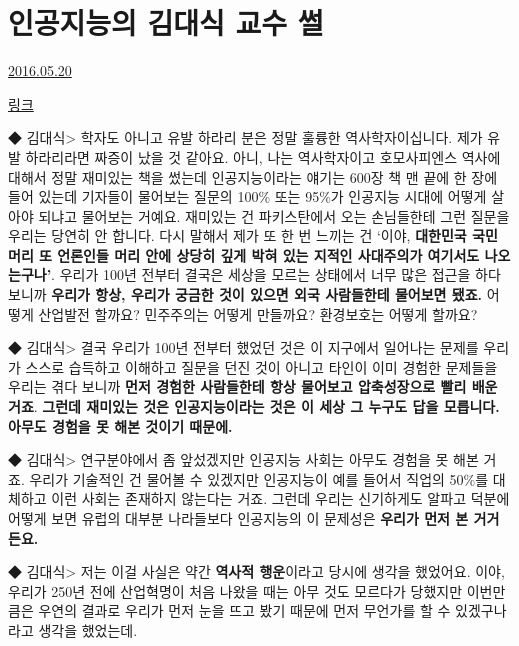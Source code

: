 \section{인공지능의 김대식 교수 썰}
\href{https://www.kockoc.com/Apoc/784899}{2016.05.20}

\vspace{5mm}

\href{http://news.naver.com/main/read.nhn?mode=LSD&mid=sec&sid1=105&oid=079&aid=0002831975}{링크}
\vspace{5mm}

◆ 김대식> 학자도 아니고 유발 하라리 분은 정말 훌륭한 역사학자이십니다. 제가 유발 하라리라면 짜증이 났을 것 같아요. 아니, 나는 역사학자이고 호모사피엔스 역사에 대해서 정말 재미있는 책을 썼는데 인공지능이라는 얘기는 600장 책 맨 끝에 한 장에 들어 있는데 기자들이 물어보는 질문의 100$\%$ 또는 95$\%$가 인공지능 시대에 어떻게 살아야 되냐고 물어보는 거예요. 재미있는 건 파키스탄에서 오는 손님들한테 그런 질문을 우리는 당연히 안 합니다. 다시 말해서 제가 또 한 번 느끼는 건 ‘이야, \textbf{대한민국 국민 머리 또 언론인들 머리 안에 상당히 깊게 박혀 있는 지적인 사대주의가 여기서도 나오는구나’}. 우리가 100년 전부터 결국은 세상을 모르는 상태에서 너무 많은 접근을 하다 보니까 \textbf{우리가 항상, 우리가 궁금한 것이 있으면 외국 사람들한테 물어보면 됐죠.} 어떻게 산업발전 할까요? 민주주의는 어떻게 만들까요? 환경보호는 어떻게 할까요?
\vspace{5mm}

◆ 김대식> 결국 우리가 100년 전부터 했었던 것은 이 지구에서 일어나는 문제를 우리가 스스로 습득하고 이해하고 질문을 던진 것이 아니고 타인이 이미 경험한 문제들을 우리는 겪다 보니까 \textbf{먼저 경험한 사람들한테 항상 물어보고 압축성장으로 빨리 배운 거죠}. \textbf{그런데 재미있는 것은 인공지능이라는 것은 이 세상 그 누구도 답을 모릅니다. 아무도 경험을 못 해본 것이기 때문에.}
\vspace{5mm}

◆ 김대식> 연구분야에서 좀 앞섰겠지만 인공지능 사회는 아무도 경험을 못 해본 거죠. 우리가 기술적인 건 물어볼 수 있겠지만 인공지능이 예를 들어서 직업의 50$\%$를 대체하고 이런 사회는 존재하지 않는다는 거죠. 그런데 우리는 신기하게도 알파고 덕분에 어떻게 보면 유럽의 대부분 나라들보다 인공지능의 이 문제성은 \textbf{우리가 먼저 본 거거든요.}
\vspace{5mm}

◆ 김대식> 저는 이걸 사실은 약간 \textbf{역사적 행운}이라고 당시에 생각을 했었어요. 이야, 우리가 250년 전에 산업혁명이 처음 나왔을 때는 아무 것도 모르다가 당했지만 이번만큼은 우연의 결과로 우리가 먼저 눈을 뜨고 봤기 때문에 먼저 무언가를 할 수 있겠구나라고 생각을 했었는데.
\vspace{5mm}

